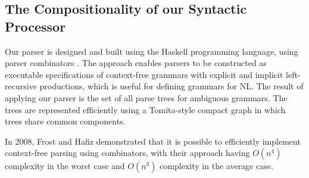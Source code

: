 \documentclass[../main.tex]{subfiles}
\begin{document}
\begin{refsection}
\subsection{The Compositionality of our Syntactic Processor}
\label{webist2019journal:compositionality-syntax}

Our parser is designed and built using the Haskell programming language, using parser combinators \cite{frosthafiz2008}. The approach enables parsers to be constructed as executable specifications of context-free grammars with explicit and implicit left-recursive productions, which is useful for defining grammars for NL. The result of applying our parser is the set of all parse trees for ambiguous grammars. The trees are represented efficiently using a Tomita-style \cite{tomita1985} compact graph in which trees share common components.

\noindent In 2008, Frost and Hafiz \cite{frosthafiz2008} demonstrated that it is possible to efficiently implement context-free parsing using combinators, with their approach having $O(n^4)$ complexity in the worst case and $O(n^3)$ complexity in the average case.


\end{refsection}
\end{document}
